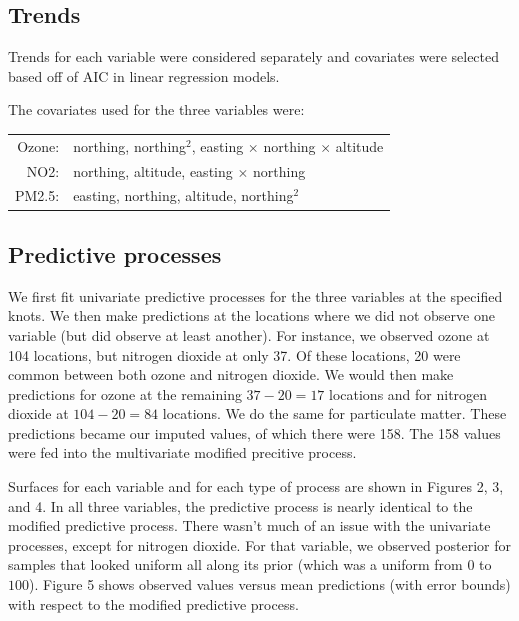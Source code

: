 \documentclass[12pt]{article}
\begin{document}
\subsection*{Trends}

Trends for each variable were considered separately and covariates were selected based off of AIC in linear regression models.
\bigskip

The covariates used for the three variables were:

\begin{table}[ht]
\begin{center}
\begin{tabular}{rl}
Ozone: & northing, northing$^2$, easting $\times$ northing $\times$ altitude \\
NO2:   & northing, altitude, easting $\times$ northing \\
PM2.5: & easting, northing, altitude, northing$^2$ \\
\end{tabular}
\end{center}
\end{table}

\subsection*{Predictive processes}

We first fit univariate predictive processes for the three variables at the specified knots. We then make predictions at the locations where we did not observe one variable (but did observe at least another). For instance, we observed ozone at 104 locations, but nitrogen dioxide at only 37. Of these locations, 20 were common between both ozone and nitrogen dioxide. We would then make predictions for ozone at the remaining $37-20=17$ locations and for nitrogen dioxide at $104-20=84$ locations. We do the same for particulate matter. These predictions became our imputed values, of which there were 158.
 The 158 values were fed into the multivariate modified precitive process.
\bigskip

Surfaces for each variable and for each type of process are shown in Figures 2, 3, and 4. In all three variables, the predictive process is nearly identical to the modified predictive process. There wasn't much of an issue with the univariate processes, except for nitrogen dioxide. For that variable, we observed posterior for samples that looked uniform all along its prior (which was a uniform from $0$ to $100$). Figure 5 shows observed values versus mean predictions (with error bounds) with respect to the modified predictive process.
\bigskip
\end{document}
